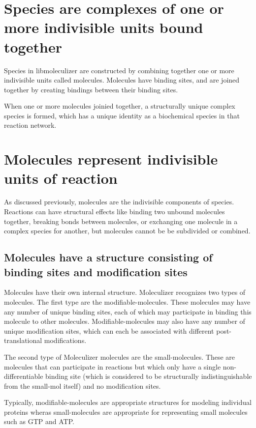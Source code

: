 \section{Species are complexes of one or more indivisible units bound together}

Species in libmoleculizer are constructed by combining together one or
more indivisible units called molecules.  Molecules have binding
sites, and are joined together by creating bindings between their
binding sites.  

When one or more molecules joinied together, a structurally unique
complex species is formed, which has a unique identity as a biochemical
species in that reaction network.

\section{Molecules represent indivisible units of reaction}
As discussed previously, molecules are the indivisible components of
species.  Reactions can have structural effects like binding two
unbound molecules together, breaking bonds between molecules, or
exchanging one molecule in a complex species for another, but
molecules cannot be be subdivided or combined. 

\subsection{Molecules have a structure consisting of binding sites and
  modification sites}

Molecules have their own internal structure.  Moleculizer recognizes
two types of molecules.  The first type are the modifiable-molecules.
These molecules may have any number of unique binding sites, each of
which may participate in binding this molecule to other molecules.
Modifiable-molecules may also have any number of unique modification
sites, which can each be associated with different post-translational
modifications.

The second type of Moleculizer molecules are the small-molecules.
These are molecules that can participate in reactions but which only
have a single non-differentiable binding site (which is considered to
be structurally indistinguishable from the small-mol itself) and no
modification sites.

Typically, modifiable-molecules are appropriate structures for
modeling individual proteins wheras small-molecules are appropriate
for representing small molecules such as GTP and ATP.

